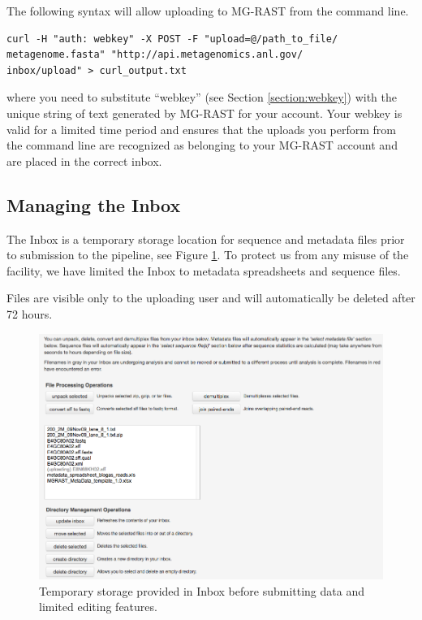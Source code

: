 \documentclass[12pt,fullpage]{report}
\begin{document}
The following syntax will allow uploading to MG-RAST from the command line.

\begin{verbatim}
curl -H "auth: webkey" -X POST -F "upload=@/path_to_file/
metagenome.fasta" "http://api.metagenomics.anl.gov/
inbox/upload" > curl_output.txt
\end{verbatim}
where you need to substitute ``webkey'' (see Section \ref{section:webkey}) with the unique string of text generated by MG-RAST for your account. Your webkey is valid for a limited time period and ensures that the uploads you perform from the command line are recognized as belonging to your MG-RAST account and are placed in the correct inbox.
\subsection{Managing the Inbox}
\label{section:managing_the_inbox}

The Inbox is a temporary storage location for sequence and metadata files prior to submission to the pipeline, see Figure \ref{fig:Inbox}. To protect us from any
misuse of the facility, we have limited the Inbox to metadata spreadsheets and sequence files.

\noindent
Files are visible only to the uploading user and will automatically be deleted after 72 hours.

\begin{figure}
\begin{center}
\includegraphics[width=6in]{Images/Inbox.png}
\end{center}
\caption{
Temporary storage provided in Inbox before submitting data and limited editing features.
}
\label{fig:Inbox}
\end{figure}
\end{document}
